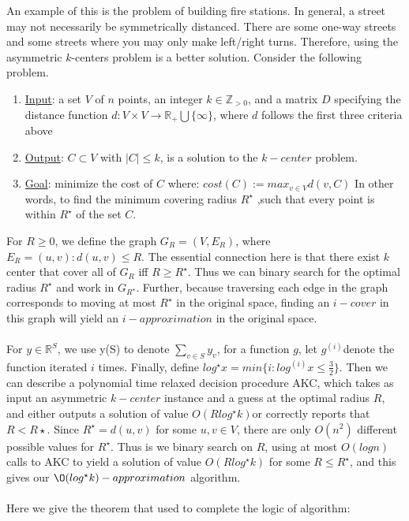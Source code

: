 \documentclass{article}
\begin{document}
An example of this is the problem of building fire stations. In general, a street may not necessarily be symmetrically distanced. There are some one-way streets and some streets where you may only make left/right turns. Therefore, using the asymmetric $k$-centers problem is a better solution. Consider the following problem.

\begin{enumerate}
\item \underline{Input}: a set $V$ of $n$ points, an integer $k\in\mathbb{Z}_{>0}$, and a matrix $D$ specifying the distance function $d:V\times V\rightarrow\mathbb{R}_+\bigcup\{\infty\}$, where $d$ follows the first three criteria above
\item \underline{Output}: $C\subset V$ with $\vert C \vert \leq k$, is a solution to the $k-center$ problem.
\item \underline{Goal}: minimize the cost of $C$ where: $cost(C):=max_{v\in V}d(v, C)$ In other words, to find the minimum covering radius $R^\star$ ,such that every point is within $R^\star$ of the set $C$.
\end{enumerate}
For $R \geq 0$, we define the graph $G_R=(V,E_R)$, where $E_R = {(u,v):d(u,v)\leq R}.$ The essential connection here is that there exist $k$ center that cover all of $G_R$ iff $R \geq R^\star$. Thus we can binary search for the optimal radius $R^\star$ and work in $G_{R^\star}$. Further, because traversing each edge in the graph corresponds to moving at most $R^\star$ in the original space, finding an $i-cover$ in this graph will yield an $i-approximation$ in the original space.\\\\
For $y \in \mathbb{R}^S$, we use y(S) to denote $\sum_{v \in S} y_v$, for a function $g$, let $g^(i) $denote the function iterated $i$ times. Finally, define $log^\star x= min\{i:log^{(i)}x\leq \frac 32\}$. Then we can describe a polynomial time relaxed decision procedure AKC, which takes as input an asymmetric $k-center$ instance and a guess at the optimal radius $R$, and either outputs a solution of value $O(Rlog^\star k) $or correctly reports that$R < R\star$. Since $R^\star = d(u,v)$ for some $u,v \in V$, there are only $O(n^2)$ different possible values for $R^\star $. Thus is we binary search on $R$, using at most $O(log n)$ calls to AKC to yield a solution of value $O(Rlog^\star k)$ for some $R\leq R^\star$, and this gives our $\O(log^\star k)-approximation$  algorithm.\\\\
Here we give the theorem that used to complete the logic of algorithm:
\end{document}
